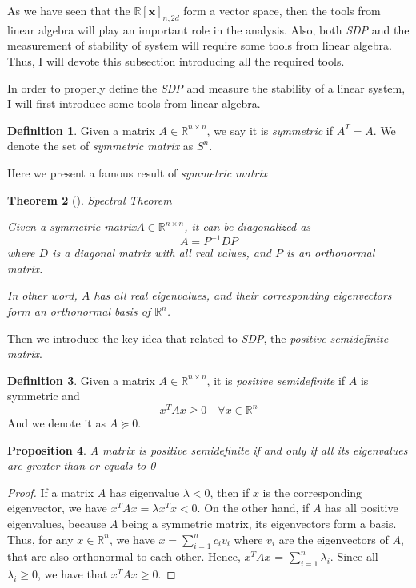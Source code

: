 \documentclass[12pt]{amsart}
\numberwithin{equation}{section}
\newtheorem{thm}{Theorem}
\newtheorem{prop}[thm]{Proposition}
\theoremstyle{definition}
\newtheorem{definition}[thm]{Definition}
\numberwithin{thm}{section}
\begin{document}
As we have seen that the $\mathbb{R}[\mathbf{x}]_{n, 2d}$ form a vector space, then the tools from linear algebra will play an important role in the analysis. 
Also, both \emph{SDP} and the measurement of stability of system will require some tools from linear algebra. 
Thus, I will devote this subsection introducing all the required tools. 

In order to properly define the \emph{SDP} and measure the stability of a linear system, I will first introduce some tools from linear algebra.

\begin{definition}
     Given a matrix $A \in \mathbb{R}^{n \times n}$, we say it is \emph{symmetric} if $A^T = A$. We denote the set of \emph{symmetric matrix} as $S^n$.  
\end{definition}

Here we present a famous result of \emph{symmetric matrix}
\begin{thm} [\cite{golub1996matrix}] Spectral Theorem

     Given a symmetric matrix$A \in \mathbb{R}^{n \times n}$, it can be diagonalized as \begin{equation*} A = P^{-1}DP \end{equation*} where $D$ is a diagonal matrix with all real values, and $P$ is an orthonormal matrix.
     
     In other word, $A$ has all real eigenvalues, and their corresponding eigenvectors form an orthonormal basis of $\mathbb{R}^n$. 
\end{thm} 

\smallskip

Then we introduce the key idea that related to \emph{SDP}, the \emph{positive semidefinite matrix}.

\begin{definition}
     Given a matrix $A \in \mathbb{R}^{n \times n}$, it is \emph{positive semidefinite} if $A$ is symmetric and \begin{equation*}
          x^T A x \geq 0 \quad \forall x \in \mathbb{R}^n
     \end{equation*}
     And we denote it as $A \succcurlyeq 0$.
\end{definition}

\begin{prop}
     A matrix is \emph{positive semidefinite} if and only if all its eigenvalues are greater than or equals to 0
\end{prop}

\begin{proof}
     If a matrix $A$ has eigenvalue $\lambda < 0$, then if $x$ is the corresponding eigenvector, we have $x^T A x = \lambda x^T x < 0$.
     On the other hand, if $A$ has all positive eigenvalues, because $A$ being a symmetric matrix, 
     its eigenvectors form a basis. Thus, for any $x \in \mathbb{R}^n$, we have
     $x = \sum_{i = 1} ^ n c_i v_i $ where $v_i$ are the eigenvectors of $A$, that are also orthonormal to each other.
     Hence, $x^T A x$ = $\sum_{i = 1} ^ n \lambda_i$. Since all $\lambda_i \geq 0$, we have that $x ^ T A x \geq 0$.
\end{proof}
\end{document}
